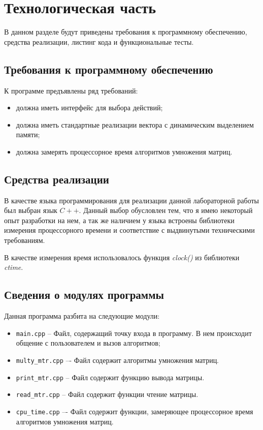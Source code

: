 \chapter{Технологическая часть}

В данном разделе будут приведены требования к программному обеспечению, средства реализации, листинг кода и функциональные тесты.

\section{Требования к программному обеспечению}

К программе предъявлены ряд требований:

\begin{itemize}
	\item должна иметь интерфейс для выбора действий;
	\item должна иметь стандартные реализации вектора с динамическим выделением памяти;
	\item должна замерять процессорное время алгоритмов умножения матриц.
\end{itemize}

\section{Средства реализации}

В качестве языка программирования для реализации данной лабораторной работы был выбран язык $C++$\cite{cpp-lang}. Данный выбор обусловлен тем,
что я имею некоторый опыт разработки на нем, а так же наличием у языка
встроены библиотеки измерения процессорного времени и соответствие с выдвинутыми техническими требованиям.

В качестве измерения время использовалось функция \textit{clock()} из библиотеки \textit{ctime}\cite{cpp-lang-time}. 

\section{Сведения о модулях программы}

Данная программа разбита на следующие модули:

\begin{itemize}
	\item \texttt{main.cpp} -- Файл, содержащий точку входа в программу. В нем происходит
	общение с пользователем и вызов алгоритмов;
	\item \texttt{multy\_mtr.cpp} –- Файл содержит алгоритмы умножения матриц.
	\item \texttt{print\_mtr.cpp} -- Файл содержит функцию вывода матрицы.
	\item \texttt{read\_mtr.cpp} -- Файл содержит функции чтение матрицы.
	\item \texttt{cpu\_time.cpp} –- Файл содержит функции, замеряющее процессорное время алгоритмов умножения матриц.
\end{itemize}

